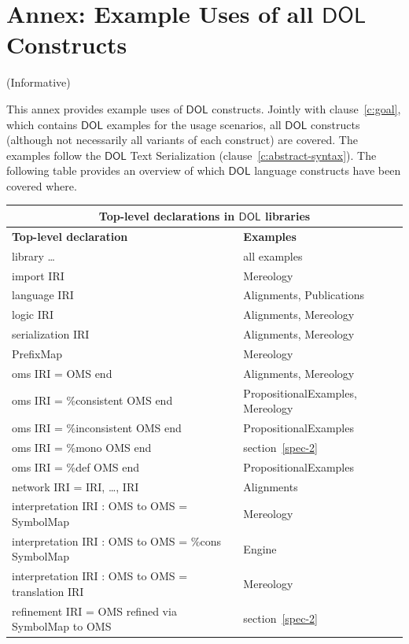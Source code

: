 \documentclass[10pt,fleqn,final]{scrreprt}
\makeatletter
\newcommand*\CommentAuthor{}
\renewcommand*\CommentAuthor{#1}}
\newcommand*\CommentDate{}
\renewcommand*\CommentDate{#1}}
\newcommand*\CommentId{}
\renewcommand*\CommentId{#1}}
\newcommand*\CommentType{}
\renewcommand*\CommentType{#1}}
\newcommand*{\SetCommentColorByType}[1]{%
\edef\localType{{#1}}%
\expandafter\ifstrequal\localType{q-aut}{\colorlet{CommentColor}{red}}{%
\expandafter\ifstrequal\localType{q-all}{\colorlet{CommentColor}{orange}}{%
\expandafter\ifstrequal\localType{todo}{\colorlet{CommentColor}{orange}}{%
\expandafter\ifstrequal\localType{fyi}{\colorlet{CommentColor}{lightgray}}{%
\colorlet{CommentColor}{yellow}}}}}}
\newcommand*{\SetCommentPrefixByType}[1]{%
\edef\localType{{#1}}%
\expandafter\@ifmtarg\localType{%
\edef\CommentPrefix{}%
}{%
\caseupper[q]{#1}%
\edef\CommentPrefix{\thestring: }%
}}
\newcommand*{\initComment}[1]{%
\setkeys{Comment}{#1}%
\SetCommentColorByType{\CommentType}%
\relax%
\SetCommentPrefixByType{\CommentType}%
\relax%
}
\newcommand*{\todonote}[2][]{%
\initComment{#1}%
\pdfcomment[author=\CommentAuthor,color=CommentColor,date=\CommentDate,id=\CommentId]{%
\CommentPrefix
#2}}
\renewcommand*{\todonote}[2][]{%
\initComment{#1}%
\ednote{\CommentPrefix #2}}
\newcommand*{\CLnote}[2][author=Christoph Lange]{%
\todonote[author=Christoph Lange,#1]{#2} 
}
\newcommand*{\DOL}{\ensuremath{\mathsf{DOL}}\xspace}
\newcommand{\clauserefname}{clause}
\newcommand{\cref}[1]{\clauserefname~\ref{#1}}
\newcommand{\informative}[0]{{\begin{center}{\Large{(Informative})}\end{center}} \bigskip}
\newcommand{\infannex}[1]{ \chapter{Annex: #1}  \informative }
\makeatother
\begin{document}
\infannex{Example Uses of all \DOL Constructs}\label{a:uses}

This annex provides example uses of \DOL constructs.  Jointly with
\cref{c:goal}, which  contains \DOL examples for the
usage scenarios, all \DOL constructs (although not necessarily all
variants of each construct) are covered.  The examples follow the \DOL
Text Serialization (\cref{c:abstract-syntax}). The following table
provides an overview of which \DOL language constructs have been 
covered where.



\begin{tabular}{|l|l|}\hline
\multicolumn{2}{|c|}{\textbf{Top-level declarations in \DOL libraries}}\\\hline
\textbf{Top-level declaration} & \textbf{Examples} \\\hline
library \ldots & all examples\\\hline
import IRI & Mereology\\\hline
language IRI  & Alignments, Publications \\\hline
logic IRI  & Alignments, Mereology \\\hline
serialization IRI  & Alignments, Mereology \\\hline
PrefixMap  & Mereology \\\hline
oms IRI = OMS end  &  Alignments, Mereology \\\hline
oms IRI = \%consistent OMS end  & PropositionalExamples, Mereology \\\hline
oms IRI = \%inconsistent OMS end  & PropositionalExamples \\\hline
oms IRI = \%mono OMS end  & section~\ref{spec-2} \\\hline
oms IRI = \%def OMS end  & PropositionalExamples \\\hline
network IRI = IRI, \ldots, IRI & Alignments \\\hline
interpretation IRI : OMS to OMS = SymbolMap  & Mereology \\\hline
interpretation IRI : OMS to OMS = \%cons SymbolMap  &  Engine\\\hline
interpretation IRI : OMS to OMS = translation IRI  & Mereology \\\hline
refinement IRI = OMS refined via SymbolMap to OMS & section~\ref{spec-2} \\\hline

\end{tabular}
\end{document}

